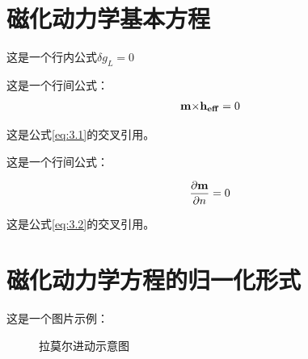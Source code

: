 	\section{磁化动力学基本方程}
	
	这是一个行内公式$ \delta {g_L}=0 $
	
	这是一个行间公式：
	\begin{align}
		{\bf{m \times }}{{\bf{h}}_{{\bf{eff}}}} = 0  \label{eq:3.1}
	\end{align}
	
	这是公式\ref{eq:3.1}的交叉引用。
	
	这是一个行间公式：
	
	\begin{align}
		\frac{{\partial {\bf{m}}}}{{\partial n}} = 0  \label{eq:3.2}
	\end{align}
	
	这是公式\ref{eq:3.2}的交叉引用。
	
	\section{磁化动力学方程的归一化形式}
	
	这是一个图片示例：
	
	\begin{figure}[htbp]
		\centering
		\caption{拉莫尔进动示意图} \label{img:1.1}
	\end{figure}

